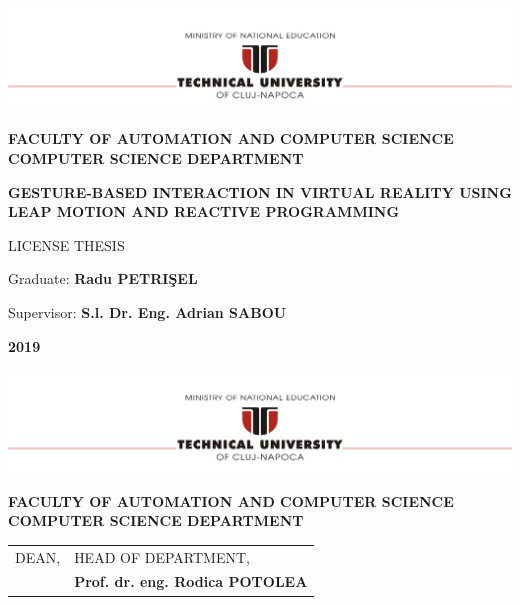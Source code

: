 \documentclass[12pt,a4paper,twoside]{report}
\renewcommand{\thesisauthor}{Radu PETRI\c{S}EL}    %
\renewcommand{\thesisyear}{2019}      %
\renewcommand{\thesistitle}{GESTURE-BASED INTERACTION IN VIRTUAL REALITY USING LEAP MOTION AND REACTIVE PROGRAMMING}
\renewcommand{\thesissupervisor}{S.l. Dr. Eng. Adrian SABOU}
\newcommand{\department}{\bf FACULTY OF AUTOMATION AND COMPUTER SCIENCE\\
COMPUTER SCIENCE DEPARTMENT}
\newcommand{\thesis}{LICENSE THESIS}
\newcommand{\utcnlogo}{\includegraphics[width=15cm]{img/tucn.jpg}}
\begin{document}

\newenvironment{definition}[1][Defini\c{t}ie.]{\begin{trivlist}
\item[\hskip \labelsep {\bfseries #1}]}{\end{trivlist}}


\setcounter{secnumdepth}{3}

\setcounter{page}{1}

\begin{center}
\utcnlogo

\department

\vspace{4cm}

{\bf \thesistitle} %

\vspace{1.5cm}

\thesis
\vspace{5.75cm}

Graduate: {\bf \thesisauthor{}} 

Supervisor: {\bf \thesissupervisor{}}

\vspace{3cm}
{\bf \thesisyear}
\end{center}

\thispagestyle{empty}
\newpage

\begin{center}
\utcnlogo

\department

\end{center}
\vspace{0.5cm}

\begin{tabular}{p{7cm}p{8cm}}
 \hspace{-1cm}DEAN, & HEAD OF DEPARTMENT,\\
 \hspace{-1cm}{\bf Prof. dr. eng. Liviu MICLEA} & {\bf Prof. dr. eng. Rodica POTOLEA}\\  
\end{tabular}
 
\vspace{2cm}
\end{document}
